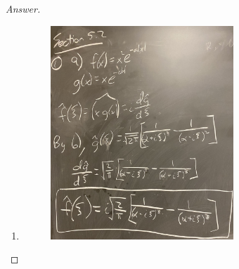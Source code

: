 \documentclass{article}
\theoremstyle{definition}
\renewcommand\qedsymbol{$\blacksquare$}
\newenvironment{ans}{\begin{proof}[Answer]\renewcommand{\qedsymbol}{}}{\end{proof}}
\begin{document}
\begin{ans}
\begin{enumerate}
        \item\phantom{.}
        \begin{figure}[H]
            \centering
            \includegraphics[width = 0.65\textwidth]{Problem 2 Part 9.jpeg}
        \end{figure}
    \end{enumerate}
\end{ans}
\end{document}
